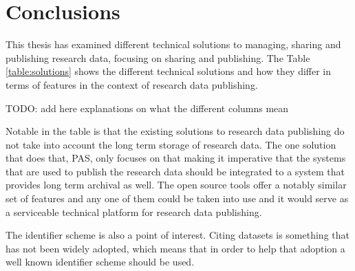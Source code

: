 \chapter{Conclusions}
\label{chapter:conclusions}

This thesis has examined different technical solutions to managing, sharing and
publishing research data, focusing on sharing and publishing. The Table
\ref{table:solutions} shows the different technical solutions and how they
differ in terms of features in the context of research data publishing.

TODO: add here explanations on what the different columns mean

Notable in the table is that the existing solutions to research data publishing
do not take into account the long term storage of research data. The one
solution that does that, PAS, only focuses on that making it imperative that
the systems that are used to publish the research data should be integrated to
a system that provides long term archival as well. The open source tools offer
a notably similar set of features and any one of them could be taken into use
and it would serve as a serviceable technical platform for research data
publishing.

The identifier scheme is also a point of interest. Citing datasets is something
that has not been widely adopted, which means that in order to help that
adoption a well known identifier scheme should be used.

